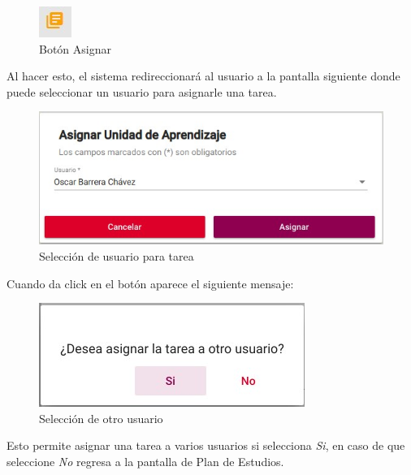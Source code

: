        \begin{figure}[H]
            \centering
            \hypertarget{boton}{\includegraphics[width=0.7\linewidth]{images/Tareas/boton}}
            \caption{Botón Asignar}
            \label{boton}
        \end{figure}

        Al hacer esto, el sistema redireccionará al usuario a la pantalla siguiente donde puede seleccionar un usuario para asignarle una tarea.

        \begin{figure}[H]
            \centering
            \hypertarget{asigna}{\includegraphics[width=0.7\linewidth]{images/Tareas/Asignando}}
            \caption{Selección de usuario para tarea}
            \label{asigna}
        \end{figure}

       Cuando da click en el botón  aparece el siguiente mensaje:
        \begin{figure}[H]
            \centering
            \hypertarget{asignar}{\includegraphics[width=0.7\linewidth]{images/Tareas/Asignarotro}}
            \caption{Selección de otro usuario}
            \label{asignar}
        \end{figure}
        Esto permite asignar una tarea a varios usuarios si selecciona \textit{Si}, en caso de que seleccione \textit{No} regresa a la pantalla de Plan de Estudios.

